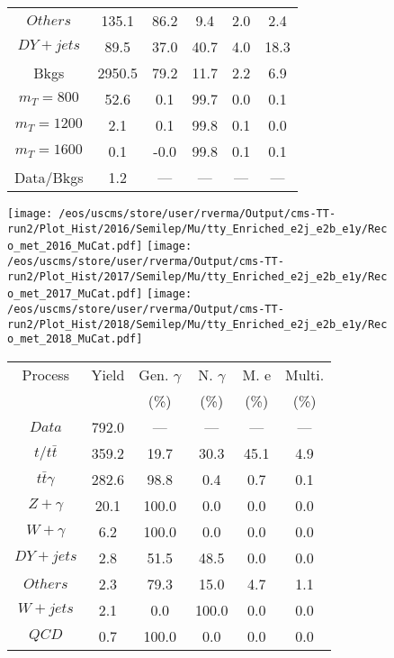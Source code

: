 \begin{figure}
\begin{minipage}[c]{0.32\textwidth}
{\begin{tabular}{cccccc}
$ Others $ &  135.1 &  86.2 &  9.4 &  2.0 &  2.4\\
$ DY+jets $ &  89.5 &  37.0 &  40.7 &  4.0 &  18.3\\
Bkgs &  2950.5 &  79.2 &  11.7 &  2.2 &  6.9\\
$ m_{T} = 800 $ &  52.6 &  0.1 &  99.7 &  0.0 &  0.1\\
$ m_{T} = 1200 $ &  2.1 &  0.1 &  99.8 &  0.1 &  0.0\\
$ m_{T} = 1600 $ &  0.1 &  -0.0 &  99.8 &  0.1 &  0.1\\
Data/Bkgs &  1.2 &  --- &  --- &  --- &  ---\\
\hline
\end{tabular}
}
\end{minipage}
\end{figure}

\begin{figure}
\centering
\texttt{[image: /eos/uscms/store/user/rverma/Output/cms-TT-run2/Plot\_Hist/2016/Semilep/Mu/tty\_Enriched\_e2j\_e2b\_e1y/Reco\_met\_2016\_MuCat.pdf]}
\texttt{[image: /eos/uscms/store/user/rverma/Output/cms-TT-run2/Plot\_Hist/2017/Semilep/Mu/tty\_Enriched\_e2j\_e2b\_e1y/Reco\_met\_2017\_MuCat.pdf]}
\texttt{[image: /eos/uscms/store/user/rverma/Output/cms-TT-run2/Plot\_Hist/2018/Semilep/Mu/tty\_Enriched\_e2j\_e2b\_e1y/Reco\_met\_2018\_MuCat.pdf]}
\begin{minipage}[c]{0.32\textwidth}
\centering
\tiny{
\begin{tabular}{cccccc}
\hline
Process & Yield & Gen. $\gamma$ & N. $\gamma$ & M. e & Multi. \\
 &  & (\%) & (\%) & (\%) & (\%)  \\
\hline
                                                                      $ Data $ &  792.0 &  --- &  --- &  --- &  ---\\
$ t/t\bar{t} $ &  359.2 &  19.7 &  30.3 &  45.1 &  4.9\\
$ t\bar{t}\gamma $ &  282.6 &  98.8 &  0.4 &  0.7 &  0.1\\
$ Z+\gamma $ &  20.1 &  100.0 &  0.0 &  0.0 &  0.0\\
$ W+\gamma $ &  6.2 &  100.0 &  0.0 &  0.0 &  0.0\\
$ DY+jets $ &  2.8 &  51.5 &  48.5 &  0.0 &  0.0\\
$ Others $ &  2.3 &  79.3 &  15.0 &  4.7 &  1.1\\
$ W+jets $ &  2.1 &  0.0 &  100.0 &  0.0 &  0.0\\
$ QCD $ &  0.7 &  100.0 &  0.0 &  0.0 &  0.0\\

\end{tabular}}
\end{minipage}
\end{figure}
